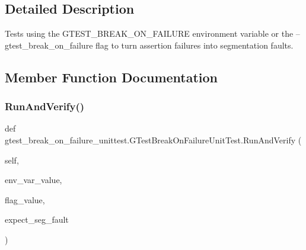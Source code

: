 \subsection{Detailed Description}
\begin{DoxyVerb}Tests using the GTEST_BREAK_ON_FAILURE environment variable or
the --gtest_break_on_failure flag to turn assertion failures into
segmentation faults.
\end{DoxyVerb}
 

\subsection{Member Function Documentation}
\mbox{\label{classgtest__break__on__failure__unittest_1_1_g_test_break_on_failure_unit_test_a0a66475873f545d88655b8bb14368f2e}} 
\subsubsection{\texorpdfstring{Run\+And\+Verify()}{RunAndVerify()}}
{\footnotesize\ttfamily def gtest\+\_\+break\+\_\+on\+\_\+failure\+\_\+unittest.\+G\+Test\+Break\+On\+Failure\+Unit\+Test.\+Run\+And\+Verify (\begin{DoxyParamCaption}\item[{}]{self,  }\item[{}]{env\+\_\+var\+\_\+value,  }\item[{}]{flag\+\_\+value,  }\item[{}]{expect\+\_\+seg\+\_\+fault }\end{DoxyParamCaption})}

